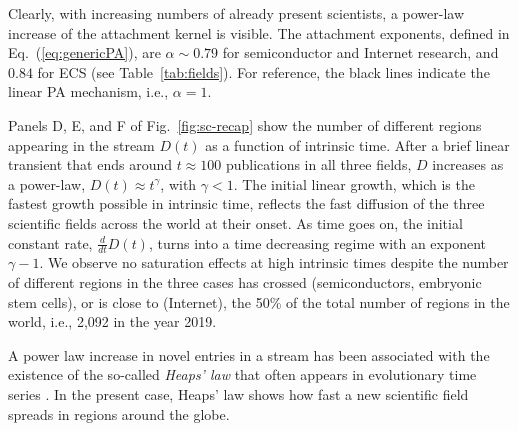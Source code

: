 \documentclass[draft,final]{vutinfth} %
\begin{document}
Clearly, with increasing numbers of already present scientists, a power-law increase of the attachment kernel is visible. The attachment exponents, defined in Eq.~(\ref{eq:genericPA}), are $\alpha\sim 0.79$ for semiconductor and Internet research, and $0.84$ for ECS (see Table~\ref{tab:fields}). For reference, the black lines indicate the linear PA mechanism, i.e., $\alpha=1$. 

Panels D, E, and F of Fig.~\ref{fig:sc-recap} show the number of different regions appearing in the stream $D(t)$ as a function of intrinsic time. After a brief linear transient that ends around $t\approx 100$ publications in all three fields, $D$ increases as a power-law, $D(t)\approx t^\gamma$, with $\gamma<1$. The initial linear growth, which is the fastest growth possible in intrinsic time, reflects the fast diffusion of the three scientific fields across the world at their onset. As time goes on, the initial constant rate, $\frac{d}{dt}D(t)$, turns into a time decreasing regime with an exponent $\gamma-1$. We observe no saturation effects at high intrinsic times despite the number of different regions in the three cases has crossed (semiconductors, embryonic stem cells), or is close to (Internet), the 50\% of the total number of regions in the world, i.e., 2,092 in the year 2019.

A power law increase in novel entries in a stream has been associated with the existence of the so-called {\em Heaps' law} that often appears in evolutionary time series \cite{Serrano09,Tria14,Mazzolini18,Tria18,Simini19}. In the present case, Heaps' law shows how fast a new scientific field spreads in regions around the globe.
\end{document}

